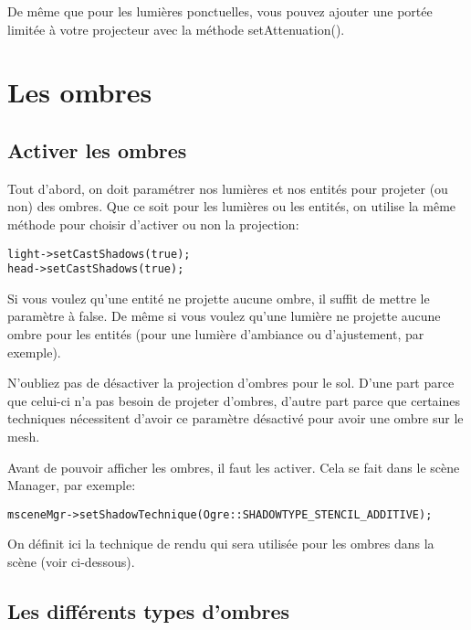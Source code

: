 De même que pour les lumières ponctuelles, vous pouvez ajouter une portée limitée à votre projecteur avec la méthode setAttenuation().






\section{Les ombres}


\subsection{Activer les ombres}

Tout d'abord, on doit paramétrer nos lumières et nos entités pour projeter (ou non) des ombres.
Que ce soit pour les lumières ou les entités, on utilise la même méthode pour choisir d'activer ou non la projection:

\begin{lstlisting}
light->setCastShadows(true);
head->setCastShadows(true);
\end{lstlisting}


Si vous voulez qu'une entité ne projette aucune ombre, il suffit de mettre le paramètre à false. De même si vous voulez qu'une lumière ne projette aucune ombre pour les entités (pour une lumière d'ambiance ou d'ajustement, par exemple).

N'oubliez pas de désactiver la projection d'ombres pour le sol. D'une part parce que celui-ci n'a pas besoin de projeter d'ombres, d'autre part parce que certaines techniques nécessitent d'avoir ce paramètre désactivé pour avoir une ombre sur le mesh.

Avant de pouvoir afficher les ombres, il faut les activer. Cela se fait dans le scène Manager, par exemple:

\begin{lstlisting}
msceneMgr->setShadowTechnique(Ogre::SHADOWTYPE_STENCIL_ADDITIVE);
\end{lstlisting}



On définit ici la technique de rendu qui sera utilisée pour les ombres dans la scène (voir ci-dessous).




\subsection{Les différents types d'ombres}

